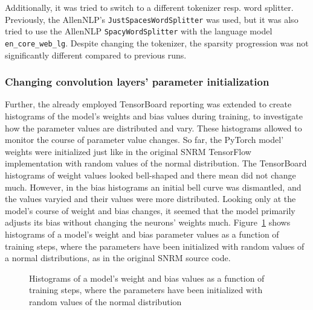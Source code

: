 Additionally, it was tried to switch to a different tokenizer resp. word splitter.
Previously, the AllenNLP's \texttt{JustSpacesWordSplitter} was used,
    but it was also tried to use the AllenNLP \texttt{SpacyWordSplitter} with the 
    language model \texttt{en\_core\_web\_lg}.
Despite changing the tokenizer, the sparsity progression was not significantly different
    compared to previous runs.

\subsubsection*{Changing convolution layers' parameter initialization}
Further, the already employed TensorBoard reporting was extended to create histograms
    of the model's weights and bias values during training, to investigate how the parameter
    values are distributed and vary.
These histograms allowed to monitor the course of parameter value changes.
So far, the PyTorch model' weights were initialized just like in the original SNRM TensorFlow
    implementation with random values of the normal distribution.
The TensorBoard histograms of weight values looked bell-shaped and there mean did not change much.
However, in the bias histograms an initial bell curve was dismantled, and the values 
    varyied and their values were more distributed.
Looking only at the model's course of weight and bias changes, it seemed that the model
    primarily adjusts its bias without changing the neurons' weights much.
Figure~\ref{fig:2020-09-29:histogram-parameter-normal-dist-init} shows histograms of a model's
    weight and bias parameter values as a function of training steps, where the parameters
    have been initialized with random values of a normal distributions, 
    as in the original SNRM source code.
\begin{figure}[htbp]
\centering
\caption[Histogram of model parameter values as a function of training steps and initialization from a normal distribution]{Histograms of a model's weight and bias values as a function of training steps, where the parameters have been initialized with random values of the normal distribution}
\label{fig:2020-09-29:histogram-parameter-normal-dist-init}
\end{figure}

